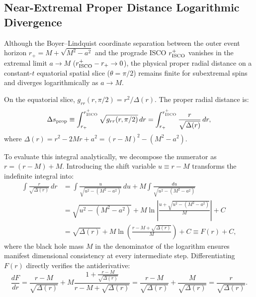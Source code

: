 \subsection{Near-Extremal Proper Distance Logarithmic Divergence}
\label{subsec:proper_distance_divergence}
Although the Boyer--Lindquist coordinate separation between the outer event horizon $r_+ = M + \sqrt{M^2 - a^2}$ and the prograde ISCO $r_{\rm ISCO}^+$ vanishes in the extremal limit $a \to M$ ($r_{\rm ISCO}^+ - r_+ \to 0$), the physical proper radial distance on a constant-$t$ equatorial spatial slice ($\theta = \pi/2$) remains finite for subextremal spins and diverges logarithmically as $a \to M$.

On the equatorial slice, $g_{rr}(r, \pi/2) = r^2/\Delta(r)$. The proper radial distance is:
\begin{equation}
    \Delta s_{\rm prop} \equiv \int_{r_+}^{r_{\rm ISCO}^+} \sqrt{g_{rr}(r, \pi/2)}\,dr = \int_{r_+}^{r_{\rm ISCO}^+} \frac{r}{\sqrt{\Delta(r)}}\,dr,
    \label{eq:proper_distance_integral}
\end{equation}
where $\Delta(r) = r^2 - 2Mr + a^2 = (r - M)^2 - (M^2 - a^2)$. 

To evaluate this integral analytically, we decompose the numerator as $r = (r - M) + M$. Introducing the shift variable $u \equiv r - M$ transforms the indefinite integral into:
\begin{align}
    \int \frac{r}{\sqrt{\Delta(r)}}\,dr &= \int \frac{u}{\sqrt{u^2 - (M^2 - a^2)}}\,du + M \int \frac{du}{\sqrt{u^2 - (M^2 - a^2)}} \nonumber \\
    &= \sqrt{u^2 - (M^2 - a^2)} + M \ln\left| \frac{u + \sqrt{u^2 - (M^2 - a^2)}}{M} \right| + C \nonumber \\
    &= \sqrt{\Delta(r)} + M \ln\left( \frac{r - M + \sqrt{\Delta(r)}}{M} \right) + C \equiv F(r) + C,
    \label{eq:proper_distance_antiderivative_derivation}
\end{align}
where the black hole mass $M$ in the denominator of the logarithm ensures manifest dimensional consistency at every intermediate step. Differentiating $F(r)$ directly verifies the antiderivative:
\begin{equation}
    \frac{dF}{dr} = \frac{r - M}{\sqrt{\Delta(r)}} + M \frac{1 + \frac{r - M}{\sqrt{\Delta(r)}}}{r - M + \sqrt{\Delta(r)}} = \frac{r - M}{\sqrt{\Delta(r)}} + \frac{M}{\sqrt{\Delta(r)}} = \frac{r}{\sqrt{\Delta(r)}}.
\end{equation}


